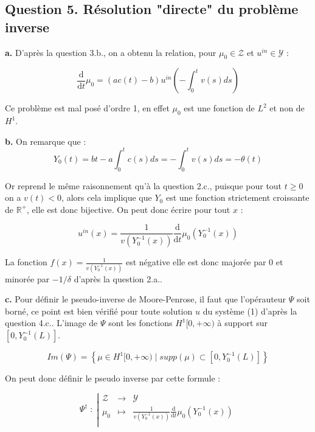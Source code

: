 \documentclass[a4paper]{article}
\newcommand{\Y}{\mathscr{Y}}
\newcommand{\Z}{\mathscr{Z}}
\begin{document}
\subsection*{Question 5. Résolution "directe" du problème inverse}

\textbf{a.}
D'après la question 3.b., on a obtenu la relation, pour $\mu_0 \in \mathscr{Z}$ 
et $u^{in} \in \mathscr{Y}$ :

\[ \displaystyle \frac{\mathrm{d}}{\mathrm{d} t} \mu_0 
= (ac(t)-b)u^{in}(-\int_0^tv(s)ds)\]

Ce problème est mal posé d'ordre 1, en effet $\mu_0$ est une fonction de $L^2$ et non de $H^1$. 

\textbf{b.}
On remarque que :
\[ Y_0(t) = bt - a\int_0^t c(s)ds = -\int_0^t v(s)ds = -\theta (t)\]

Or reprend le même raisonnement qu'à la question 2.c., puisque pour tout $t \geq 0 $ on a $v(t)<0$,
alors cela implique que $Y_0$ est une fonction strictement croissante de $\mathbb{R}^+$, elle est donc bijective.
On peut donc écrire pour tout $x $ :

\[ u^{in}(x) = \displaystyle \frac{1}{v(Y_0^{-1}(x))} \frac{\mathrm{d}}{\mathrm{d} t} \mu_0 (Y_0^{-1}(x))\]

La fonction $f(x) = \frac{1}{v(Y_0^{-1}(x))} $ est négative elle est donc majorée par $0$ et minorée par $-1/\delta$ d'après la question 2.a..

\textbf{c.}
Pour définir le pseudo-inverse de Moore-Penrose, il faut que l'opérauteur $\Psi$ soit borné, ce point est bien vérifié pour toute solution $u$ du système (1) d'après la question 4.c..
L'image de $\Psi$ sont les fonctions $H^1[0,+\infty)$ à support sur $[0,Y_0^{-1}(L)]$.

\[ Im(\Psi) = \left\{\mu \in H^1[0,+\infty) \;|\; supp(\mu) \subset[0,Y_0^{-1}(L)] \right\} \]

On peut donc définir le pseudo inverse par cette formule :

\begin{equation}
	 \Psi^\dagger \; : \; \left\vert
	\begin{array}{ccc}
	\Z & \to & \Y \\
	\mu_0 & \mapsto & \displaystyle \frac{1}{v(Y_0^{-1}(x))} \frac{\mathrm{d}}{\mathrm{d} t} \mu_0 (Y_0^{-1}(x)) \\
	\end{array} \right.
\end{equation}
\end{document}

